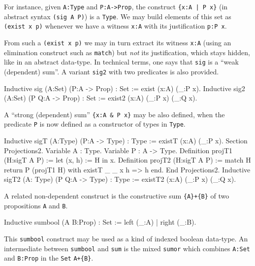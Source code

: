 For instance, given \verb|A:Type| and \verb|P:A->Prop|, the construct
\verb+{x:A | P x}+ (in abstract syntax \verb+(sig A P)+) is a
\verb:Type:. We may build elements of this set as \verb:(exist x p):
whenever we have a witness \verb|x:A| with its justification
\verb|p:P x|.

From such a \verb:(exist x p): we may in turn extract its witness
\verb|x:A| (using an elimination construct such as \verb:match:) but
{\sl not} its justification, which stays hidden, like in an abstract
data-type. In technical terms, one says that \verb:sig: is a ``weak
(dependent) sum''.  A variant \verb:sig2: with two predicates is also
provided.


\begin{coq_example*}
Inductive sig (A:Set) (P:A -> Prop) : Set := exist (x:A) (_:P x).
Inductive sig2 (A:Set) (P Q:A -> Prop) : Set :=
  exist2 (x:A) (_:P x) (_:Q x).
\end{coq_example*}

A ``strong (dependent) sum'' \verb+{x:A & P x}+ may be also defined,
when the predicate \verb:P: is now defined as a
constructor of types in \verb:Type:.

\ttindex{\&}

\begin{coq_example*}
Inductive sigT (A:Type) (P:A -> Type) : Type := existT (x:A) (_:P x).
Section Projections2.
Variable A : Type.
Variable P : A -> Type.
Definition projT1 (H:sigT A P) := let (x, h) := H in x.
Definition projT2 (H:sigT A P) :=
  match H return P (projT1 H) with
    existT _ _ x h => h
  end.
End Projections2.
Inductive sigT2 (A: Type) (P Q:A -> Type) : Type :=
    existT2 (x:A) (_:P x) (_:Q x).
\end{coq_example*}

A related non-dependent construct is the constructive sum
\verb"{A}+{B}" of two propositions \verb:A: and \verb:B:.
\label{sumbool}

\begin{coq_example*}
Inductive sumbool (A B:Prop) : Set := left (_:A) | right (_:B).
\end{coq_example*}

This \verb"sumbool" construct may be used as a kind of indexed boolean
data-type. An intermediate between \verb"sumbool" and \verb"sum" is
the mixed \verb"sumor" which combines \verb"A:Set" and \verb"B:Prop"
in the \verb"Set" \verb"A+{B}".

